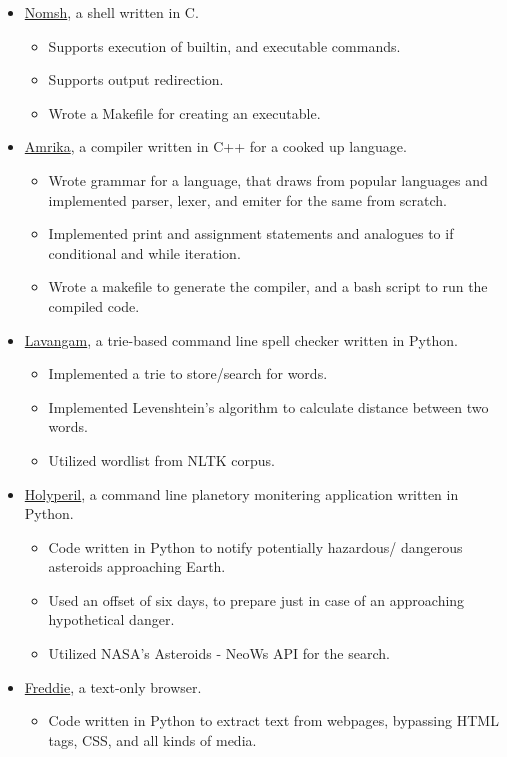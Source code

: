 \documentclass{article}
\begin{document}
\begin{itemize}
\item \href{https://github.com/rcreddyn/nomsh}{Nomsh}, a shell written in C.
\begin{itemize}
\item Supports execution of builtin, and executable commands.
\item Supports output redirection.
\item Wrote a Makefile for creating an executable.
\end{itemize}
\item  \href{https://github.com/rcreddyn/nomsh}{Amrika}, a compiler written in C++ for a cooked up language.
\begin{itemize}
\item Wrote grammar for a language, that draws from popular languages and implemented parser, lexer, and emiter for the same from scratch.
\item Implemented print and assignment statements and analogues to if conditional and while iteration.
\item Wrote a makefile to generate the compiler, and a bash script to run the compiled code.
\end{itemize}
\item \href{https://github.com/rcreddyn/nomsh}{Lavangam}, a trie-based command line spell checker written in Python.
\begin{itemize}
\item Implemented a trie to store/search for words.
\item Implemented Levenshtein's algorithm to calculate distance between two words.
\item Utilized wordlist from NLTK corpus.
\end{itemize}
\item \href{https://github.com/rcreddyn/nomsh}{Holyperil}, a command line planetory monitering application written in Python. 
\begin{itemize}
\item Code written in Python to notify potentially hazardous/ dangerous asteroids approaching Earth.
\item Used an offset of six days, to prepare just in case of an approaching hypothetical danger.
\item Utilized NASA's Asteroids - NeoWs API for the search.
\end{itemize}
\item \href{https://github.com/rcreddyn/nomsh}{Freddie}, a text-only browser.
\begin{itemize}
\item Code written in Python to extract text from webpages, bypassing HTML tags, CSS, and all kinds of media.
\end{itemize}
\end{itemize} 
\end{document}

